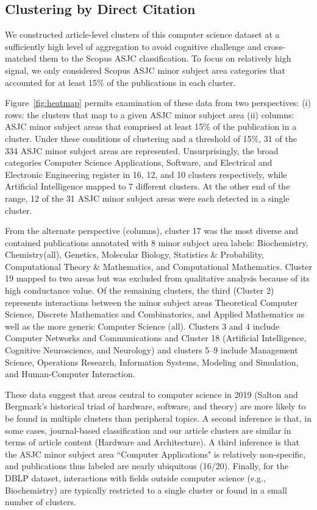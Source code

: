 \subsection{Clustering by Direct Citation}  

We constructed article-level clusters of this computer science dataset at a sufficiently high level of aggregation to avoid cognitive challenge and cross-matched them to  the  Scopus ASJC classification. 
To focus on relatively high signal, we only considered Scopus ASJC minor subject area categories that accounted for at least 15\% of the publications in each cluster. 

Figure~\ref{fig:heatmap} permits examination of these data from two perspectives: (i) rows: the clusters that map to a given ASJC minor subject area (ii) columns: ASJC minor subject areas that comprised at least 15\% of the publication in a cluster. Under these conditions of clustering and a threshold of 15\%, 31 of the 334 ASJC minor subject areas are represented. Unsurprisingly, the broad categories Computer Science Applications, Software, and Electrical and Electronic Engineering register in 16, 12, and 10 clusters respectively, while Artificial Intelligence mapped to 7 different clusters. At the other end of the range, 12 of the 31 ASJC minor subject areas were each detected in a single cluster. 

From the alternate perspective (columns), cluster 17 was the most diverse and contained publications annotated with 8 minor subject area labels: Biochemistry, Chemistry(all), Genetics, Molecular Biology,  Statistics \& Probability, Computational Theory \& Mathematics, and Computational Mathematics. Cluster 19 mapped to two areas but was excluded from qualitative analysis because of its high conductance value. Of the remaining clusters, the third (Cluster 2) represents interactions between the minor subject areas Theoretical Computer Science, Discrete Mathematics and Combinatorics, and Applied Mathematics as well as the more generic Computer Science (all). Clusters 3 and 4 include Computer Networks and Communications and Cluster 18 (Artificial Intelligence, Cognitive Neuroscience, and Neurology) and clusters 5--9 include Management Science, Operations Research, Information Systems, Modeling and Simulation, and Human-Computer Interaction.

These data suggest that areas central to computer science in 2019 (Salton and Bergmark's historical triad of hardware, software, and theory) are more likely to be found in multiple clusters than peripheral topics.
A second inference is that, in some cases, journal-based classification and our article clusters are similar in terms of article content (Hardware and Architecture). 
A third inference is that the ASJC minor subject area ``Computer Applications" is relatively non-specific, and publications thus labeled are nearly ubiquitous (16/20).  Finally,   for the DBLP dataset, interactions with fields outside computer science (e.g., Biochemistry)  are  typically restricted to a single cluster or found in a small number of clusters.

